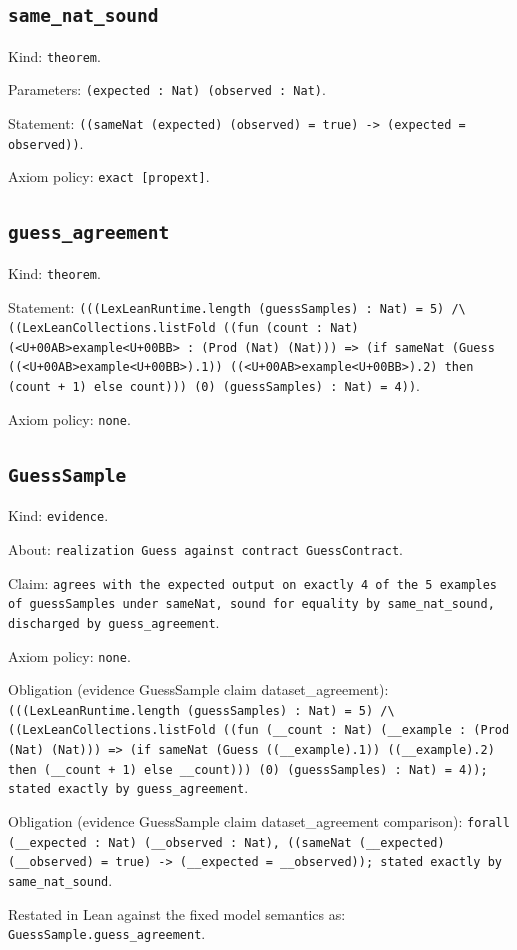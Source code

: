 \documentclass[11pt]{article}
\begin{document}
\subsection*{\texttt{same\_nat\_sound}}
\noindent Kind: \texttt{theorem}.\par
\noindent Parameters: \texttt{(expected : Nat) (observed : Nat)}.\par
\noindent Statement: \texttt{((sameNat (expected) (observed) = true) -> (expected = observed))}.\par
\noindent Axiom policy: \texttt{exact [propext]}.\par
\subsection*{\texttt{guess\_agreement}}
\noindent Kind: \texttt{theorem}.\par
\noindent Statement: \texttt{(((LexLeanRuntime.length (guessSamples) : Nat) = 5) /\textbackslash{} ((LexLeanCollections.listFold ((fun (count : Nat) (<U+00AB>example<U+00BB> : (Prod (Nat) (Nat))) => (if sameNat (Guess ((<U+00AB>example<U+00BB>).1)) ((<U+00AB>example<U+00BB>).2) then (count + 1) else count))) (0) (guessSamples) : Nat) = 4))}.\par
\noindent Axiom policy: \texttt{none}.\par
\subsection*{\texttt{GuessSample}}
\noindent Kind: \texttt{evidence}.\par
\noindent About: \texttt{realization Guess against contract GuessContract}.\par
\noindent Claim: \texttt{agrees with the expected output on exactly 4 of the 5 examples of guessSamples under sameNat, sound for equality by same\_nat\_sound, discharged by guess\_agreement}.\par
\noindent Axiom policy: \texttt{none}.\par
\noindent Obligation (evidence GuessSample claim dataset\_agreement): \texttt{(((LexLeanRuntime.length (guessSamples) : Nat) = 5) /\textbackslash{} ((LexLeanCollections.listFold ((fun (\_\_count : Nat) (\_\_example : (Prod (Nat) (Nat))) => (if sameNat (Guess ((\_\_example).1)) ((\_\_example).2) then (\_\_count + 1) else \_\_count))) (0) (guessSamples) : Nat) = 4)); stated exactly by guess\_agreement}.\par
\noindent Obligation (evidence GuessSample claim dataset\_agreement comparison): \texttt{forall (\_\_expected : Nat) (\_\_observed : Nat), ((sameNat (\_\_expected) (\_\_observed) = true) -> (\_\_expected = \_\_observed)); stated exactly by same\_nat\_sound}.\par
\noindent Restated in Lean against the fixed model semantics as: \texttt{GuessSample.guess\_agreement}.\par
\end{document}
